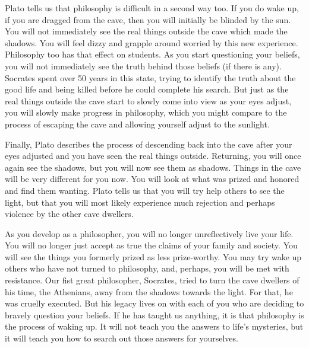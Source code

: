 \documentclass[]{article}
\begin{document}
Plato tells us that philosophy is difficult in a second way too. If you
do wake up, if you are dragged from the cave, then you will initially be
blinded by the sun. You will not immediately see the real things outside
the cave which made the shadows. You will feel dizzy and grapple around
worried by this new experience. Philosophy too has that effect on
students. As you start questioning your beliefs, you will not
immediately see the truth behind those beliefs (if there is any).
Socrates spent over 50 years in this state, trying to identify the truth
about the good life and being killed before he could complete his
search. But just as the real things outside the cave start to slowly
come into view as your eyes adjust, you will slowly make progress in
philosophy, which you might compare to the process of escaping the cave
and allowing yourself adjust to the sunlight.

Finally, Plato describes the process of descending back into the cave
after your eyes adjusted and you have seen the real things outside.
Returning, you will once again see the shadows, but you will now see
them as shadows. Things in the cave will be very different for you now.
You will look at what was prized and honored and find them wanting.
Plato tells us that you will try help others to see the light, but that
you will most likely experience much rejection and perhaps violence by
the other cave dwellers.

As you develop as a philosopher, you will no longer unreflectively live
your life. You will no longer just accept as true the claims of your
family and society. You will see the things you formerly prized as less
prize-worthy. You may try wake up others who have not turned to
philosophy, and, perhaps, you will be met with resistance. Our fist
great philosopher, Socrates, tried to turn the cave dwellers of his
time, the Athenians, away from the shadows towards the light. For that,
he was cruelly executed. But his legacy lives on with each of you who
are deciding to bravely question your beliefs. If he has taught us
anything, it is that philosophy is the process of waking up. It will not
teach you the answers to life's mysteries, but it will teach you how to
search out those answers for yourselves.
\end{document}
